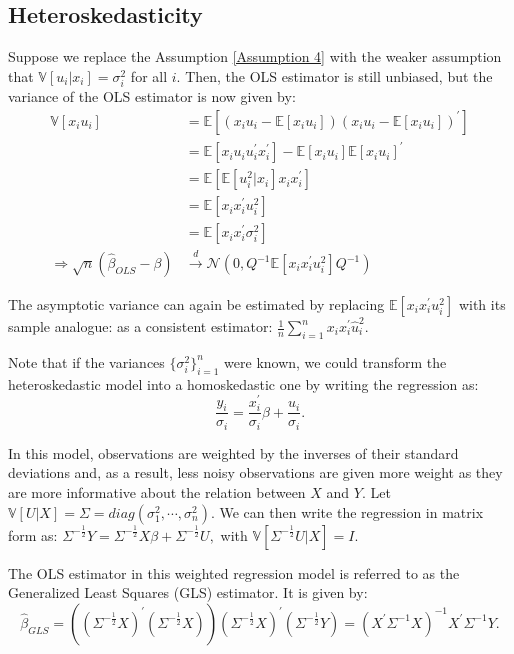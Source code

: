 \subsection{Heteroskedasticity}
Suppose we replace the Assumption \ref{Assumption 4} with the weaker assumption that $\mathbb{V}[u_i | x_i] = \sigma^2_i$ for all $i$.
Then, the OLS estimator is still unbiased, but the variance of the OLS estimator is now given by:
\begin{align*}
  \mathbb{V}[x_i u_i] &= \mathbb{E}[\left(x_i u_i - \mathbb{E}[x_i u_i]\right) \left(x_i u_i - \mathbb{E}[x_i u_i]\right)^{\prime}]\\
  &= \mathbb{E}[x_i u_i u_i^{\prime}  x_i^{\prime}] - \mathbb{E}[x_i u_i] \mathbb{E}[x_i u_i]^{\prime}\\
  &= \mathbb{E}[\mathbb{E}[u_i^2 | x_i] x_i x_i^{\prime}]\\
  &= \mathbb{E}[x_i x_i^{\prime} u_i^2] \\
  &= \mathbb{E}[x_i x_i^{\prime} \sigma^2_i] \\
  \Rightarrow \sqrt{n}(\hat{\beta}_{OLS} - \beta) &\overset{d}{\rightarrow} \mathcal{N} (0, Q^{-1} \mathbb{E}[x_i x_i^{\prime} u_i^2] Q^{-1})  
\end{align*}

The asymptotic variance can again be estimated by replacing $\mathbb{E}[x_i x_i^{\prime} u_i^2]$ with its sample analogue:
as a consistent estimator: $\frac{1}{n}\sum_{i=1}^{n} x_i x_i^{\prime} \hat{u}_i^2.$

Note that if the variances $\{\sigma_i^2\}_{i=1}^n$ were known, we could transform the heteroskedastic model
into a homoskedastic one by writing the regression as:
\[ \frac{y_i}{\sigma_i} = \frac{x_i^{\prime} }{\sigma_i} \beta + \frac{u_i}{\sigma_i}. \]

In this model, observations are weighted by the inverses of their standard deviations and, as
a result, less noisy observations are given more weight as they are more informative about
the relation between $X$ and $Y$. Let $\mathbb{V}[U|X] = \Sigma = diag{(\sigma_1^2, \cdots, \sigma_n^2)}.$
We can then write the regression in matrix form as:
$\Sigma^{-\frac{1}{2}}Y = \Sigma^{-\frac{1}{2}}X \beta + \Sigma^{-\frac{1}{2}}U,$
with $\mathbb{V}[\Sigma^{-\frac{1}{2}}U|X] = I.$

The OLS estimator in this weighted regression model is referred to as the Generalized Least Squares (GLS) estimator.
It is given by:
\[ \hat{\beta}_{GLS} = \left(\left(\Sigma^{-\frac{1}{2}}X \right)^{\prime}\left(\Sigma^{-\frac{1}{2}}X \right)\right)\left(\Sigma^{-\frac{1}{2}}X \right)^{\prime} \left(\Sigma^{-\frac{1}{2}}Y \right)  = (X^{\prime} \Sigma^{-1} X)^{-1} X^{\prime} \Sigma^{-1} Y. \]

